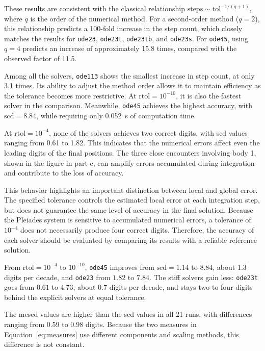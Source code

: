 \documentclass[11pt]{article}
\newcommand{\code}[1]{\texttt{#1}}
\begin{document}
These results are consistent with the classical relationship
$\mathrm{steps}\sim\mathrm{tol}^{-1/(q+1)}$, where $q$ is the order
of the numerical method. For a second-order method ($q=2$),
this relationship predicts a 100-fold increase in the step count,
which closely matches the results for \texttt{ode23},
\texttt{ode23t}, \texttt{ode23tb}, and \texttt{ode23s}.
For \texttt{ode45}, using $q=4$ predicts an increase of
approximately 15.8 times, compared with the observed factor of 11.5.

Among all the solvers, \texttt{ode113} shows the smallest increase
in step count, at only 3.1 times. Its ability to adjust the method
order allows it to maintain efficiency as the tolerance becomes
more restrictive. At $\mathrm{rtol}=10^{-10}$, it is also the
fastest solver in the comparison. Meanwhile, \texttt{ode45}
achieves the highest accuracy, with $\mathrm{scd}=8.84$,
while requiring only 0.052~s of computation time.

At $\mathrm{rtol}=10^{-4}$, none of the solvers achieves two
correct digits, with scd values ranging from 0.61 to 1.82.
This indicates that the numerical errors affect even the
leading digits of the final positions. The three close
encounters involving body 1, shown in the figure in part c,
can amplify errors accumulated during integration and
contribute to the loss of accuracy.

This behavior highlights an important distinction between
local and global error. The specified tolerance controls
the estimated local error at each integration step, but
does not guarantee the same level of accuracy in the
final solution. Because the Pleiades system is sensitive
to accumulated numerical errors, a tolerance of $10^{-4}$
does not necessarily produce four correct digits.
Therefore, the accuracy of each solver should be evaluated
by comparing its results with a reliable reference solution.


From $\text{rtol} = 10^{-4}$ to $10^{-10}$, \code{ode45} improves from
$\text{scd} = 1.14$ to $8.84$, about $1.3$ digits per decade, and \code{ode23}
from $1.82$ to $7.84$. The stiff solvers gain less: \code{ode23t} goes from
$0.61$ to $4.73$, about $0.7$ digits per decade, and stays two to four digits
behind the explicit solvers at equal tolerance.

The mescd values are higher than the scd values in all 21 runs,
with differences ranging from 0.59 to 0.98 digits. Because the two measures in
Equation~\ref{eq:measures} use different components and scaling
methods, this difference is not constant.
\end{document}
